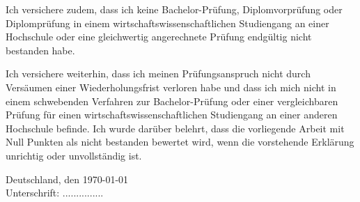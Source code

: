 \documentclass[paper=a4,12pt,titlepage,listof=totoc]{scrartcl}
\begin{document}
Ich versichere zudem, dass ich keine Bachelor-Prüfung, Diplomvorprüfung oder Diplomprüfung in einem wirtschaftswissenschaftlichen Studiengang an einer Hochschule oder eine gleichwertig angerechnete Prüfung endgültig nicht bestanden habe.

Ich versichere weiterhin, dass ich meinen Prüfungsanspruch nicht durch Versäumen einer Wiederholungsfrist verloren habe und dass ich mich nicht in einem schwebenden Verfahren zur Bachelor-Prüfung oder einer vergleichbaren Prüfung für einen wirtschaftswissenschaftlichen Studiengang an einer anderen Hochschule befinde.
Ich wurde darüber belehrt, dass die vorliegende Arbeit mit Null Punkten als nicht bestanden bewertet wird, wenn die vorstehende Erklärung unrichtig oder unvollständig ist.

\vskip 1cm
Deutschland, den \today \\

Unterschrift: ...............

\fi
\end{document}
